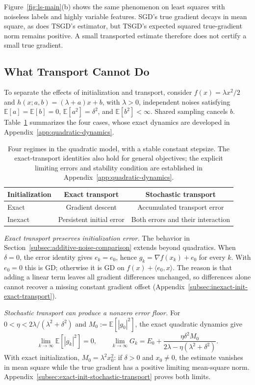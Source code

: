 Figure~\ref{fig:ls-main}(b) shows the same phenomenon on least squares
with noiseless labels and highly variable features. SGD's true gradient
decays in mean square, as does TSGD's estimator, but TSGD's expected
squared true-gradient norm remains positive. A small transported
estimate therefore does not certify a small true gradient.

\subsection{What Transport Cannot Do}
\label{subsec:four-case-summary}

To separate the effects of initialization and transport, consider
$f(x)=\lambda x^2/2$ and $h(x;a,b)=(\lambda+a)x+b$, with $\lambda>0$,
independent noises satisfying $\mathbb E[a]=\mathbb E[b]=0$,
$\mathbb E[a^2]=\delta^2$, and $\mathbb E[b^2]<\infty$.
Shared sampling cancels $b$. Table~\ref{tab:four-error-regimes} summarizes
the four cases, whose exact dynamics are developed in
Appendix~\ref{app:quadratic-dynamics}.

\begin{table}[t]
\centering
\small
\begin{tabular}{@{}lcc@{}}
\toprule
Initialization & Exact transport & Stochastic transport\\
\midrule
Exact & Gradient descent & Accumulated transport error\\
Inexact & Persistent initial error & Both errors and their interaction\\
\bottomrule
\end{tabular}
\caption{Four regimes in the quadratic model, with a stable constant
stepsize. The exact-transport identities also hold for general
objectives; the explicit limiting errors and stability condition
are established in Appendix~\ref{app:quadratic-dynamics}.}
\label{tab:four-error-regimes}
\end{table}

\emph{Exact transport preserves initialization error.}
The behavior in Section~\ref{subsec:additive-noise-comparison} extends
beyond quadratics. When $\delta=0$, the error identity gives $e_k=e_0$, hence
$g_k=\nabla f(x_k)+e_0$ for every $k$. With $e_0=0$ this is GD;
otherwise it is GD on $f(x)+\langle e_0,x\rangle$. The reason is that
adding a linear term leaves all gradient differences
unchanged, so differences alone cannot recover a missing constant
gradient offset
(Appendix~\ref{subsec:inexact-init-exact-transport}).

\emph{Stochastic transport can produce a nonzero error floor.}
For $0<\eta<2\lambda/(\lambda^2+\delta^2)$ and
$M_0:=\mathbb E[|g_0|^2]$, the exact quadratic dynamics give
\begin{equation}
\label{eq:quadratic-residual-overview}
\lim_{k\to\infty}\mathbb E[|g_k|^2]=0,\qquad
\lim_{k\to\infty}G_k
=E_0+\frac{\eta\delta^2 M_0}{2\lambda-\eta(\lambda^2+\delta^2)}.
\end{equation}
With exact initialization, $M_0=\lambda^2x_0^2$: if $\delta>0$ and
$x_0\ne0$, the estimate vanishes in mean square while the true gradient
has a positive limiting mean-square norm.
Appendix~\ref{subsec:exact-init-stochastic-transport} proves both limits.

